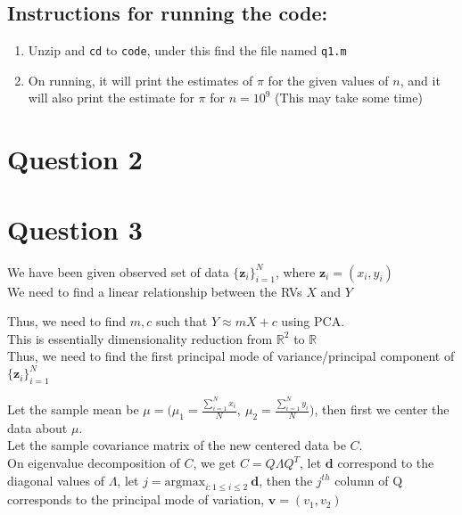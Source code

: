 \documentclass[11pt, fleqn]{article}
\begin{document}
\subsection*{Instructions for running the code:}
\begin{enumerate}[itemsep=-1ex]
    \item Unzip and \texttt{cd} to \texttt{code}, under this find the file named \texttt{q1.m}
    \item On running, it will print the estimates of $\pi$ for the given values of $n$, and it will also print the estimate for $\pi$ for $n = 10^9$ (This may take some time)
\end{enumerate}





\newpage
\section*{Question 2}
\setcounter{equation}{0}
\setcounter{figure}{0}

\newpage
\section*{Question 3}
\setcounter{equation}{0}
\setcounter{figure}{0}
We have been given observed set of data $\{ \mathbf{z}_i \}_{i=1}^{N}$, where $\mathbf{z}_i = (x_i, y_i)$\\
We need to find a linear relationship between the RVs $X$ and $Y$

\medskip
Thus, we need to find $m, c$ such that $Y \approx mX + c$ using PCA.\\
This is essentially dimensionality reduction from $\mathbb{R}^2$ to $\mathbb{R}$\\
Thus, we need to find the first principal mode of variance/principal component of $\{ \mathbf{z}_i \}_{i=1}^{N}$

\medskip
Let the sample mean be $\mu = \bigg(\mu_1 = \frac{\sum_{i=1}^{N}x_i}{N},\  \mu_2 = \frac{\sum_{i=1}^{N}y_i}{N}\bigg)$, then first we center the data about $\mu$.\\
Let the sample covariance matrix of the new centered data be $C$.\\
On eigenvalue decomposition of $C$, we get $C = Q\Lambda Q^T$, let $\mathbf{d}$ correspond to the diagonal values of $\Lambda$, let $j = \text{argmax}_{i: 1\le i\le 2} \ \mathbf{d}$, then the $j^{th}$ column of Q corresponds to the principal mode of variation, $\mathbf{v} = (v_1, v_2)$
\end{document}
